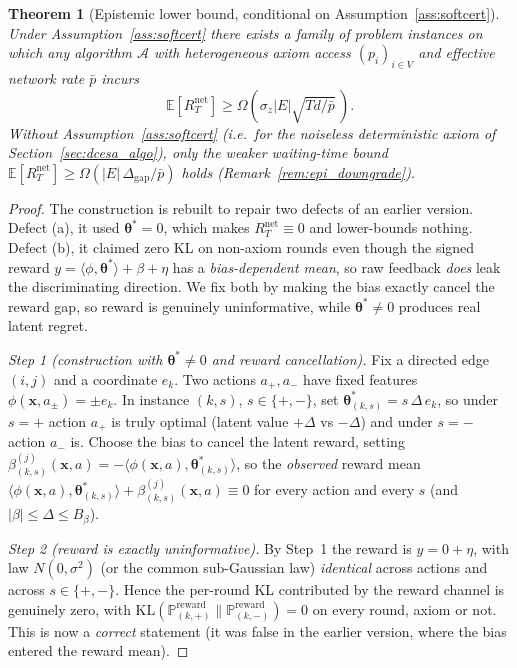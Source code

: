 \documentclass[11pt]{article}
\newtheorem{theorem}{Theorem}[section]
\begin{document}
\begin{theorem}[Epistemic lower bound, conditional on
Assumption~\ref{ass:softcert}]\label{thm:lower_epistemic}
Under Assumption~\ref{ass:softcert} there exists a family of problem
instances on which any algorithm $\mathcal{A}$ with heterogeneous axiom
access $(p_i)_{i\in V}$ and effective network rate $\bar{p}$ incurs
\[
\mathbb{E}[R_T^{\mathrm{net}}]\geq\Omega\!\left(\sigma_z|E|\sqrt{Td/\bar{p}}\,\right).
\]
Without Assumption~\ref{ass:softcert} (i.e.\ for the noiseless
deterministic axiom of Section~\ref{sec:dcesa_algo}), only the weaker
waiting-time bound $\mathbb{E}[R_T^{\mathrm{net}}]\geq\Omega(|E|\,\Delta_{\mathrm{gap}}/\bar p)$
holds (Remark~\ref{rem:epi_downgrade}).
\end{theorem}

\begin{proof}
The construction is rebuilt to repair two defects of an earlier
version. Defect (a), it used $\bm{\theta}^{\!*}=0$, which makes
$R_T^{\mathrm{net}}\equiv 0$ and lower-bounds nothing. Defect (b), it
claimed zero KL on non-axiom rounds even though the signed reward
$y=\langle\phi,\bm{\theta}^{\!*}\rangle+\beta+\eta$ has a
\emph{bias-dependent mean}, so raw feedback \emph{does} leak the
discriminating direction.  We fix both by making the bias exactly
cancel the reward gap, so reward is genuinely uninformative, while
$\bm{\theta}^{\!*}\neq 0$ produces real latent regret.

\textit{Step 1 (construction with $\bm{\theta}^{\!*}\neq 0$ and reward
cancellation).}
Fix a directed edge $(i,j)$ and a coordinate $e_k$.  Two actions
$a_+,a_-$ have fixed features $\phi(\bm{x},a_\pm)=\pm e_k$.  In instance
$(k,s)$, $s\in\{+,-\}$, set
$\bm{\theta}^{\!*}_{(k,s)}=s\,\Delta\,e_k$, so under $s=+$ action $a_+$
is truly optimal (latent value $+\Delta$ vs $-\Delta$) and under $s=-$
action $a_-$ is.  Choose the bias to cancel the latent reward, setting
$\beta^{(j)}_{(k,s)}(\bm{x},a)=-\langle\phi(\bm{x},a),\bm{\theta}^{\!*}_{(k,s)}\rangle$,
so the \emph{observed} reward mean
$\langle\phi(\bm{x},a),\bm{\theta}^{\!*}_{(k,s)}\rangle
+\beta^{(j)}_{(k,s)}(\bm{x},a)\equiv 0$
for every action and every $s$ (and $|\beta|\leq\Delta\leq B_\beta$).

\textit{Step 2 (reward is exactly uninformative).}
By Step~1 the reward is $y=0+\eta$, with law $N(0,\sigma^2)$ (or the
common sub-Gaussian law) \emph{identical} across actions and across
$s\in\{+,-\}$.  Hence the per-round KL contributed by the reward
channel is genuinely zero, with
$\mathrm{KL}(\mathbb{P}_{(k,+)}^{\mathrm{reward}}\|
\mathbb{P}_{(k,-)}^{\mathrm{reward}})=0$ on every round, axiom or not.
This is now a \emph{correct} statement (it was false in the earlier
version, where the bias entered the reward mean).


\end{proof}
\end{document}
